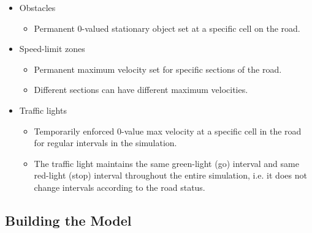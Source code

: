 \documentclass[11pt]{article}
\providecommand{\tightlist}{%
      \setlength{\itemsep}{0pt}\setlength{\parskip}{0pt}}
\begin{document}
\begin{itemize}
\tightlist
\item
  Obstacles

  \begin{itemize}
  \tightlist
  \item
    Permanent 0-valued stationary object set at a specific cell on the
    road.
  \end{itemize}
\item
  Speed-limit zones

  \begin{itemize}
  \tightlist
  \item
    Permanent maximum velocity set for specific sections of the road.
  \item
    Different sections can have different maximum velocities.
  \end{itemize}
\item
  Traffic lights

  \begin{itemize}
  \tightlist
  \item
    Temporarily enforced 0-value max velocity at a specific cell in the
    road for regular intervals in the simulation.
  \item
    The traffic light maintains the same green-light (go) interval and
    same red-light (stop) interval throughout the entire simulation,
    i.e. it does not change intervals according to the road status.
  \end{itemize}
\end{itemize}

    \subsection{Building the Model}
\end{document}
